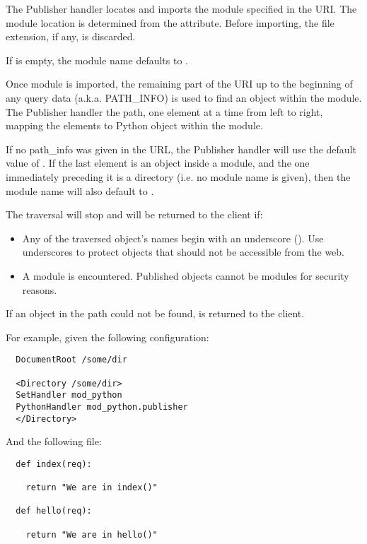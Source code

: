 The Publisher handler locates and imports the module specified in the
URI. The module location is determined from the 
attribute. Before importing, the file extension, if any, is
discarded. 

If  is empty, the module name defaults to
.

Once module is imported, the remaining part of the URI up to the
beginning of any query data (a.k.a. PATH_INFO) is used to find an
object within the module. The Publisher handler  the 
path, one element at a time from left to right, mapping the elements
to Python object within the module.

If no path_info was given in the URL, the Publisher handler will use
the default value of . If the last element is an object inside
a module, and the one immediately preceding it is a directory
(i.e. no module name is given), then the module name will also default
to .

The traversal will stop and  will be returned to
the client if:

\begin{itemize}

\item
  Any of the traversed object's names begin with an underscore
  (\samp{\_}). Use underscores to protect objects that should not be
  accessible from the web.

\item
  A module is encountered. Published objects cannot be modules for
  security reasons.

\end{itemize}

If an object in the path could not be found, 
is returned to the client.

For example, given the following configuration:

\begin{verbatim}
  DocumentRoot /some/dir

  <Directory /some/dir>
  SetHandler mod_python
  PythonHandler mod_python.publisher
  </Directory>
\end{verbatim}

And the following  file:

\begin{verbatim}
  def index(req):

    return "We are in index()"

  def hello(req):

    return "We are in hello()"
\end{verbatim}

